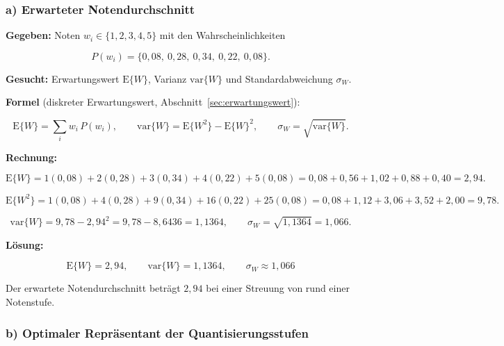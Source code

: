 \subsubsection*{a) Erwarteter Notendurchschnitt}

\begin{beispiel}

\textbf{Gegeben:} Noten $w_i \in \{1, 2, 3, 4, 5\}$ mit den Wahrscheinlichkeiten

$$
P(w_i) = \{0{,}08,\ 0{,}28,\ 0{,}34,\ 0{,}22,\ 0{,}08\}.
$$

\textbf{Gesucht:} Erwartungswert $\mathrm{E}\{W\}$, Varianz $\mathrm{var}\{W\}$
und Standardabweichung $\sigma_W$.

\textbf{Formel} (diskreter Erwartungswert, Abschnitt~\ref{sec:erwartungswert}):

$$
\mathrm{E}\{W\} = \sum_i w_i\, P(w_i), \qquad
\mathrm{var}\{W\} = \mathrm{E}\{W^2\} - \mathrm{E}\{W\}^2, \qquad
\sigma_W = \sqrt{\mathrm{var}\{W\}}.
$$

\textbf{Rechnung:}

$$
\mathrm{E}\{W\} = 1(0{,}08) + 2(0{,}28) + 3(0{,}34) + 4(0{,}22) + 5(0{,}08)
= 0{,}08 + 0{,}56 + 1{,}02 + 0{,}88 + 0{,}40 = 2{,}94.
$$

$$
\mathrm{E}\{W^2\} = 1(0{,}08) + 4(0{,}28) + 9(0{,}34) + 16(0{,}22) + 25(0{,}08)
= 0{,}08 + 1{,}12 + 3{,}06 + 3{,}52 + 2{,}00 = 9{,}78.
$$

$$
\mathrm{var}\{W\} = 9{,}78 - 2{,}94^2 = 9{,}78 - 8{,}6436 = 1{,}1364,
\qquad \sigma_W = \sqrt{1{,}1364} = 1{,}066.
$$

\textbf{Lösung:}

$$
\boxed{\;\mathrm{E}\{W\} = 2{,}94, \qquad
\mathrm{var}\{W\} = 1{,}1364, \qquad
\sigma_W \approx 1{,}066\;}
$$

Der erwartete Notendurchschnitt beträgt $2{,}94$ bei einer Streuung von rund
einer Notenstufe.

\end{beispiel}

\subsubsection*{b) Optimaler Repräsentant der Quantisierungsstufen}

